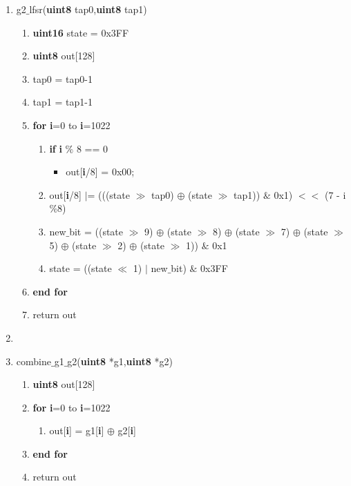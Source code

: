 \documentclass[journal,10pt,onecolumn]{article}
\begin{document}
\begin{enumerate}
\begin{enumerate}
    \item g2$\_$lfsr(\textbf{uint8} tap0,\textbf{uint8} tap1)
    \begin{enumerate}
        \item[] \textbf{uint16} state = 0x3FF
        \item[] \textbf{uint8}  out[128]
        \item[] tap0 = tap0-1
        \item[] tap1 = tap1-1 
        \item[] \textbf{for} \textbf{i}=0 to \textbf{i}=1022
        \begin{enumerate}
            \item[] \textbf{if} \textbf{i} $\%$ 8 == 0
            \begin{itemize}
                \item[] out[\textbf{i}/8] = 0x00; 
            \end{itemize}
            \item[] out[\textbf{i}/8] $|$= (((state $\gg$ tap0) $\oplus$ (state $\gg$ tap1)) $\&$ 0x1) $<<$ (7 - i$\%$8)
            \item[] new$\_$bit =  ((state $\gg$ 9) $\oplus$ (state $\gg$ 8) $\oplus$
            (state $\gg$ 7) $\oplus$ (state $\gg$ 5) $\oplus$
            (state $\gg$ 2) $\oplus$ (state $\gg$ 1)) $\&$ 0x1
            \item[] state = ((state $\ll$ 1) $\vert$ new$\_$bit) $\&$ 0x3FF
        \end{enumerate}
        \item[] \textbf{end for}
        \item[] return out
    \end{enumerate}
    

    \item[]
    \item combine$\_$g1$\_$g2(\textbf{uint8} *g1,\textbf{uint8} *g2)
    \begin{enumerate}
        \item[] \textbf{uint8} out[128]
        \item[] \textbf{for} \textbf{i}=0 to \textbf{i}=1022
        \begin{enumerate}
            \item[] out[\textbf{i}] = g1[\textbf{i}] $\oplus$ g2[\textbf{i}]
        \end{enumerate}
        \item[]  \textbf{end for}
        \item[]  return out
    \end{enumerate}
    


\end{enumerate}
\end{enumerate}
\end{document}
